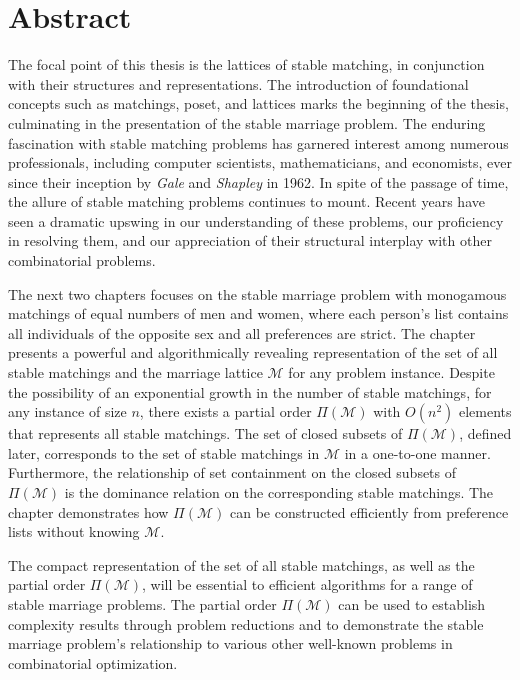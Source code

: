 \chapter{Abstract}

The focal point of this thesis is the lattices of stable matching, in conjunction with their structures and representations. The introduction of foundational concepts such as matchings, poset, and lattices marks the beginning of the thesis, culminating in the presentation of the stable marriage problem. The enduring fascination with stable matching problems has garnered interest among numerous professionals, including computer scientists, mathematicians, and economists, ever since their inception by \textit{Gale} and \textit{Shapley} in 1962. In spite of the passage of time, the allure of stable matching problems continues to mount. Recent years have seen a dramatic upswing in our understanding of these problems, our proficiency in resolving them, and our appreciation of their structural interplay with other combinatorial problems.

The next two chapters focuses on the stable marriage problem with monogamous matchings of equal numbers of men and women, where each person's list contains all individuals of the opposite sex and all preferences are strict. The chapter presents a powerful and algorithmically revealing representation of the set of all stable matchings and the marriage lattice $\mathcal{M}$ for any problem instance. Despite the possibility of an exponential growth in the number of stable matchings, for any instance of size $n$, there exists a partial order $\Pi(\mathcal{M})$ with $O(n^2)$ elements that represents all stable matchings. The set of closed subsets of $\Pi(\mathcal{M})$, defined later, corresponds to the set of stable matchings in $\mathcal{M}$ in a one-to-one manner. Furthermore, the relationship of set containment on the closed subsets of $\Pi(\mathcal{M})$ is the dominance relation on the corresponding stable matchings. The chapter demonstrates how $\Pi(\mathcal{M})$ can be constructed efficiently from preference lists without knowing $\mathcal{M}$.

The compact representation of the set of all stable matchings, as well as the partial order $\Pi(\mathcal{M})$, will be essential to efficient algorithms for a range of stable marriage problems. The partial order $\Pi(\mathcal{M})$ can be used to establish complexity results through problem reductions and to demonstrate the stable marriage problem's relationship to various other well-known problems in combinatorial optimization.
